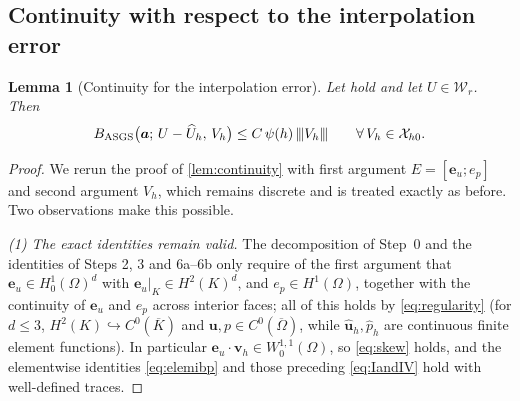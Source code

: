 \documentclass[11pt,a4paper]{article}
\newcommand{\bu}{\boldsymbol{u}}
\newcommand{\ba}{\boldsymbol{a}}
\newcommand{\beu}{\boldsymbol{e}_{u}}
\newcommand{\bvh}{\boldsymbol{v}_h}
\newcommand{\buhat}{\widehat{\boldsymbol{u}}_h}
\newcommand{\Xh}{\mathcal{X}_{h0}}
\newcommand{\triplenorm}[1]{{\lvert\kern-0.25ex\lvert\kern-0.25ex\lvert #1
\rvert\kern-0.25ex\rvert\kern-0.25ex\rvert}}
\theoremstyle{plain}
\newtheorem{lemma}{Lemma}[section]
\theoremstyle{remark}
\theoremstyle{definition}
\numberwithin{equation}{section}
\begin{document}
\subsection{Continuity with respect to the interpolation error}

\begin{lemma}[Continuity for the interpolation error]\label{lem:continterp}
Let  hold and let $U\in\mathcal{W}_r$. Then
\begin{equation}\label{eq:continterp}
  B_{\mathrm{ASGS}}\bigl(\ba;\,U-\widehat{U}_h,\,V_h\bigr)
  \le C\,\psi(h)\,\triplenorm{V_h}
  \qquad\forall\,V_h\in\Xh .
\end{equation}
\end{lemma}

\begin{proof}
We rerun the proof of \cref{lem:continuity} with first argument $E=[\beu;e_p]$ and second
argument $V_h$, which remains discrete and is treated exactly as before. Two
observations make this possible.

\smallskip\noindent\emph{(1) The exact identities remain valid.}
The decomposition of Step~0 and the identities of Steps 2, 3 and 6a--6b only require of
the first argument that $\beu\in H^1_0(\Omega)^d$ with $\beu|_K\in H^2(K)^d$, and
$e_p\in H^1(\Omega)$, together with the continuity of $\beu$ and $e_p$ across interior
faces; all of this holds by \eqref{eq:regularity} (for $d\le 3$,
$H^2(K)\hookrightarrow C^0(\overline{K})$ and $\bu,p\in C^0(\overline{\Omega})$, while
$\buhat,\widehat{p}_h$ are continuous finite element functions). In particular
$\beu\cdot\bvh\in W^{1,1}_0(\Omega)$, so \eqref{eq:skew} holds, and the elementwise
identities \eqref{eq:elemibp} and those preceding \eqref{eq:IandIV} hold with
well-defined traces.


\end{proof}
\end{document}
